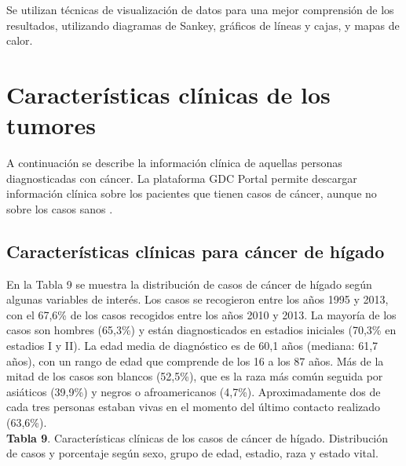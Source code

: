Se utilizan técnicas de visualización de datos para una mejor comprensión de los resultados, utilizando diagramas de Sankey, gráficos de líneas y cajas, y mapas de calor.

\section{Características clínicas de los tumores}
 
A continuación se describe la información clínica de aquellas personas diagnosticadas con cáncer. La plataforma GDC Portal permite descargar información clínica sobre los pacientes que tienen casos de cáncer, aunque no sobre los casos sanos \cite{GDCPortal}. 

\subsection{Características clínicas para cáncer de hígado}

En la Tabla 9 se muestra  la distribución de casos de cáncer de hígado según algunas variables de interés. Los casos se recogieron entre los años 1995 y 2013, con el 67,6\% de los casos recogidos entre los años 2010 y 2013. La mayoría de los casos son hombres (65,3\%) y están diagnosticados en estadios iniciales (70,3\% en estadios I y II). La edad media de diagnóstico es de 60,1 años (mediana: 61,7 años), con un rango de edad que comprende de los 16 a los 87 años. Más de la mitad de los casos son blancos (52,5\%), que es la raza más común seguida por asiáticos (39,9\%) y negros o afroamericanos (4,7\%). Aproximadamente dos de cada tres personas estaban vivas en el momento del último contacto realizado (63,6\%).\\

\newpage
\textbf{Tabla 9}. Características clínicas de los casos de cáncer de hígado. Distribución de casos y porcentaje según sexo, grupo de edad, estadio, raza y estado vital.

